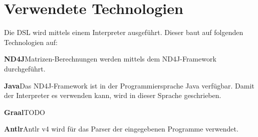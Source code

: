 \section{Verwendete Technologien}
Die \ac{DSL} wird mittels einem Interpreter ausgeführt.
Dieser baut auf folgenden Technologien auf:
\begin{description}
	\item{\textbf{ND4J}}\newline Matrizen-Berechnungen werden mittels dem ND4J-Framework durchgeführt.
	\item{\textbf{Java}}\newline Das ND4J-Framework ist in der Programmiersprache Java verfügbar. Damit der Interpreter es verwenden kann, wird in dieser Sprache geschrieben.
	\item{\textbf{Graal}}\newline TODO
	\item{\textbf{Antlr}}\newline Antlr v4 wird für das Parser der eingegebenen Programme verwendet.
\end{description}

\endinput
